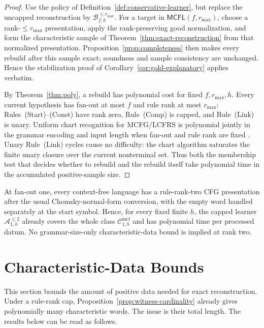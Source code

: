 \documentclass[11pt]{article}
\numberwithin{equation}{section}
\theoremstyle{plain}
\theoremstyle{definition}
\theoremstyle{remark}
\newcommand{\Cmcf}[2]{\mathcal{C}^{\mathrm{mcf}}_{#1,#2}}
\begin{document}
\begin{proof}
Use the policy of Definition~\ref{def:conservative-learner}, but replace the
uncapped reconstruction by $\mathcal B_{f,h}^{\le r_{\max}}$.  For a target in
$\mathsf{MCFL}(f,r_{\max})$, choose a rank-$\le r_{\max}$ presentation,
apply the rank-preserving good normalization, and form the characteristic
sample of Theorem~\ref{thm:exact-reconstruction} from that normalized
presentation.  Proposition~\ref{prop:completeness} then makes every rebuild
after this sample exact; soundness and sample consistency are unchanged.
Hence the stabilization proof of Corollary~\ref{cor:gold-explanatory} applies
verbatim.

By Theorem~\ref{thm:poly}, a rebuild has polynomial cost for fixed
$f,r_{\max},h$.  Every current hypothesis has fan-out at most $f$ and rule
rank at most $r_{\max}$: Rules~(Start)--(Const) have rank zero, Rule~(Comp) is capped,
and Rule~(Link) is unary.  Uniform chart recognition for MCFG/LCFRS is polynomial jointly in
the grammar encoding and input length when fan-out and rule rank are fixed
\cite{SekiEtAl1991,Kallmeyer2010}.  Unary Rule~(Link) cycles cause no
difficulty: the chart algorithm saturates the finite unary closure over the
current nonterminal set.  Thus both the membership test that decides whether
to rebuild and the rebuild itself take polynomial time in the accumulated
positive-sample size.
\end{proof}

At fan-out one, every context-free language has a rule-rank-two CFG
presentation after the usual Chomsky-normal-form conversion, with the empty
word handled separately at the start symbol.  Hence, for every fixed finite
$h$, the capped learner $\mathcal A_{1,h}^{\le2}$ already covers the whole
class $\Cmcf{1}{h}$ and has polynomial time per processed datum.  No grammar-size-only characteristic-data bound is implied at rank two.

\section{Characteristic-Data Bounds}
\label{sec:char-data}

This section bounds the amount of positive data needed for exact
reconstruction.  Under a rule-rank cap, Proposition~\ref{prop:witness-cardinality}
already gives polynomially many characteristic words.  The issue is their
total length.  The results below can be read as follows.
\end{document}
